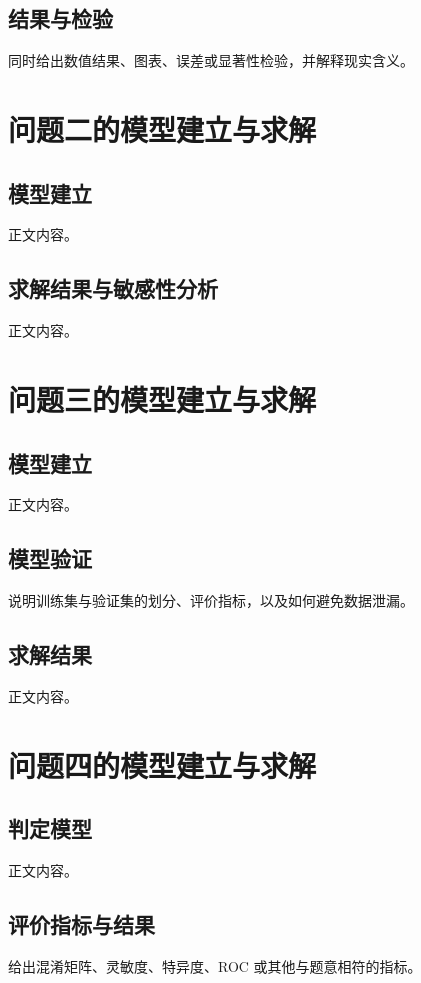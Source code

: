 \documentclass[UTF8,a4paper,12pt,fontset=fandol]{ctexart}
\begin{document}
\subsection{结果与检验}
同时给出数值结果、图表、误差或显著性检验，并解释现实含义。

\section{问题二的模型建立与求解}
\subsection{模型建立}
正文内容。

\subsection{求解结果与敏感性分析}
正文内容。

\section{问题三的模型建立与求解}
\subsection{模型建立}
正文内容。

\subsection{模型验证}
说明训练集与验证集的划分、评价指标，以及如何避免数据泄漏。

\subsection{求解结果}
正文内容。

\section{问题四的模型建立与求解}
\subsection{判定模型}
正文内容。

\subsection{评价指标与结果}
给出混淆矩阵、灵敏度、特异度、ROC 或其他与题意相符的指标。
\end{document}
